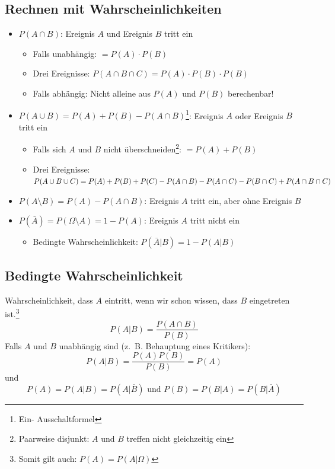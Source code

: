 \subsection{Rechnen mit Wahrscheinlichkeiten}
\begin{itemize}
  \item $P(A \cap B)$: Ereignis $A$ und Ereignis $B$ tritt ein
    \begin{itemize}
      \item Falls unabhängig: $= P(A) \cdot P(B)$
      \item Drei Ereignisse:
        $P(A \cap B \cap C) = P(A) \cdot P(B) \cdot P(B)$
      \item Falls abhängig: Nicht alleine aus $P(A)$ und $P(B)$
        berechenbar!
    \end{itemize}
  \item $P(A \cup B) = P(A) + P(B) - P(A \cap B)$\footnote{Ein-
    Ausschaltformel}: Ereignis $A$ oder Ereignis $B$ tritt ein
    \begin{itemize}
      \item Falls sich $A$ und $B$ nicht überschneiden\footnote{
        Paarweise disjunkt: $A$ und $B$ treffen nicht gleichzeitig ein}:
        $= P(A) + P(B)$
      \item Drei Ereignisse: $P(A \cup B \cup C) \\ = P(A) + P(B) + P(C)
        - P(A \cap B) - P(A \cap C) - P(B \cap C) + P(A \cap B \cap C)$
    \end{itemize}
  \item $P(A \setminus B) = P(A) - P(A \cap B)$: Ereignis $A$ tritt ein, aber ohne
    Ereignis $B$
  \item $P(\bar{A}) = P(\Omega \setminus A) = 1 - P(A)$: Ereignis $A$
    tritt nicht ein
  \begin{itemize}
    \item Bedingte Wahrscheinlichkeit: $P(\bar{A}|B) = 1 - P(A|B)$
  \end{itemize}
\end{itemize}

\subsection{Bedingte Wahrscheinlichkeit}
Wahrscheinlichkeit, dass $A$ eintritt, wenn wir schon wissen, dass $B$
eingetreten ist.\footnote{Somit gilt auch: $P(A) = P(A|\Omega)$}
\[ P(A|B) = \frac{P(A \cap B)}{P(B)} \]
Falls $A$ und $B$ unabhängig sind (z.~B. Behauptung eines Kritikers):
\[ P(A|B) = \frac{P(A) P(B)}{P(B)} = P(A) \]
und
\[P(A) = P(A|B) = P(A|\overline{B}) \text{ und } P(B) = P(B|A)
= P(B|\overline{A})\]


